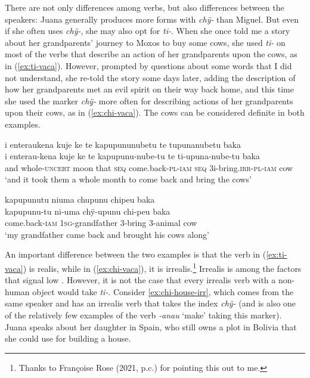 There are not only differences among verbs, but also differences between the speakers: Juana generally produces more forms with \textit{chÿ-} than Miguel. But even if she often uses \textit{chÿ-}, she may also opt for \textit{ti-}. When she once told me a story about her grandparents’ journey to Moxos to buy some cows, she used \textit{ti-} on most of the verbs that describe an action of her grandparents upon the cows, as in (\ref{ex:ti-vaca}). However, prompted by questions about some words that I did not understand, she re-told the story some days later, adding the description of how her grandparents met an evil spirit on their way back home, and this time she used the marker \textit{chÿ-} more often for describing actions of her grandparents upon their cows, as in (\ref{ex:chi-vaca}). The cows can be considered definite in both examples.

\ea\label{ex:ti-vaca}
\begingl 
\glpreamble i enteraukena kuje ke te kapupununubetu te tupunanubetu baka\\
\gla i enterau-kena kuje ke te kapupunu-nube-tu te ti-upuna-nube-tu baka\\ 
\glb and whole-\textsc{uncert} moon that \textsc{seq} come.back-\textsc{pl}-\textsc{iam} \textsc{seq} 3i-bring.\textsc{irr}-\textsc{pl}-\textsc{iam} cow\\ 
\glft ‘and it took them a whole month to come back and bring the cows’
\trailingcitation{[jxx-e150925l-1.206]}
\xe

\newpage
\ea\label{ex:chi-vaca}
\begingl
\glpreamble kapupunutu niuma chupunu chipeu baka\\
\gla kapupunu-tu ni-uma chÿ-upunu chi-peu baka\\
\glb come.back-\textsc{iam} 1\textsc{sg}-grandfather 3-bring 3-animal cow\\
\glft ‘my grandfather came back and brought his cows along’
\endgl
\trailingcitation{[jxx-p151016l-2.259]}
\xe

An important difference between the two examples is that the verb in (\ref{ex:ti-vaca}) is realis, while in (\ref{ex:chi-vaca}), it is irrealis.\footnote{Thanks to Françoise Rose (2021, p.c.) for pointing this out to me.} Irrealis is among the factors that signal low  \citep[252]{HopperThompson1980}. However, it is not the case that every irrealis verb with a non-human object would take \textit{ti-}. Consider \ref{ex:chi-house-irr}, which comes from the same speaker and has an irrealis verb that takes the index \textit{chÿ-} (and is also one of the relatively few examples of the verb \textit{-anau} ‘make’ taking this marker). Juana speaks about her daughter in Spain, who still owns a plot in Bolivia that she could use for building a house.

